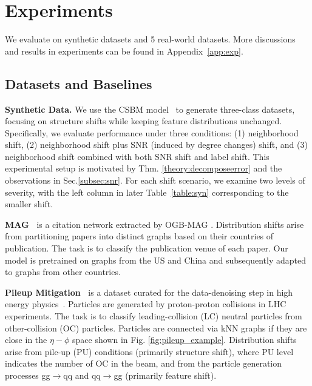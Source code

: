 \section{Experiments}  

We evaluate \proj %
on synthetic datasets and 5 real-world datasets. More discussions and results in experiments can be found in Appendix~\ref{app:exp}.

\subsection{Datasets and Baselines}

\textbf{Synthetic Data.} 
We use the CSBM model~\cite{deshpande2018contextual} to generate three-class datasets, focusing on structure shifts while keeping feature distributions unchanged. Specifically, we evaluate performance under three conditions: (1) neighborhood shift, (2) neighborhood shift plus SNR (induced by degree changes) shift, and (3) neighborhood shift combined with both SNR shift and label shift. This experimental setup is motivated by Thm. \ref{theory:decomposeerror} and the observations in Sec.\ref{subsec:snr}. For each shift scenario, we examine two levels of severity, with the left column in later Table~\ref{table:syn} corresponding to the smaller shift.

\textbf{MAG~\cite{liu2024pairwise}} is a citation network extracted by OGB-MAG \cite{hu2020open}.
Distribution shifts arise from partitioning papers into distinct graphs based on their countries of publication. The task is to classify the publication venue of each paper. Our model is pretrained on graphs from the US and China and subsequently adapted to graphs from other countries.

\textbf{Pileup Mitigation~\cite{liu2023structural}} is a dataset curated for the data-denoising step in high energy physics~\cite{bertolini2014pileup}.
Particles are generated by proton-proton collisions in LHC experiments. The task is to classify leading-collision (LC) neutral particles from other-collision (OC) particles. Particles are connected via kNN graphs if they are close in the $\eta-\phi$ space shown in Fig. \ref{fig:pileup_example}.
Distribution shifts arise from pile-up (PU) conditions (primarily structure shift), where PU level indicates the number of OC in the beam, and from the particle generation processes gg$\rightarrow$qq and qq$\rightarrow$gg (primarily feature shift).


